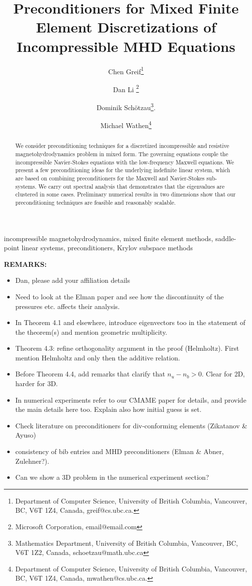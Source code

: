 \documentclass{siamltex}
\title{Preconditioners for Mixed Finite Element Discretizations of Incompressible MHD Equations}
\author{
Chen Greif\thanks{Department of Computer Science,
University of British Columbia, Vancouver, BC, V6T 1Z4, Canada,
 greif@cs.ubc.ca.} \and Dan Li \thanks{Microsoft Corporation, email@email.com} \and
 Dominik
Sch\"{o}tzau\thanks{Mathematics Department, University of British
Columbia, Vancouver, BC, V6T 1Z2, Canada,
schoetzau@math.ubc.ca}.
\and Michael Wathen\thanks{Department of Computer Science,
University of British Columbia, Vancouver, BC, V6T 1Z4, Canada,
 mwathen@cs.ubc.ca.}
}
\begin{document}
\maketitle


\begin{abstract}
We consider preconditioning techniques for a discretized incompressible and resistive magnetohydrodynamics problem in mixed form. The governing equations couple the incompressible Navier-Stokes equations with the low-frequency Maxwell equations. We present a few preconditioning ideas for the underlying indefinite linear system, which are based on combining preconditioners for the Maxwell and Navier-Stokes sub-systems. We carry out spectral analysis that demonstrates that the eigenvalues are clustered in some cases. Preliminary numerical results in two dimensions show that our preconditioning techniques are feasible and reasonably scalable.
\end{abstract}

\begin{keywords}
incompressible magnetohydrodynamics, mixed finite element methods, saddle-point linear systems, preconditioners, Krylov subspace methods
\end{keywords}

{\bf REMARKS:}
\begin{itemize}
\item Dan, please add your affiliation details
\item Need to look at the Elman paper and see how the discontinuity of the pressures etc. affects their analysis.
\item In Theorem 4.1 and elsewhere, introduce eigenvectors too in the statement of the theorem(s) and mention geometric multiplicity.
\item Theorem 4.3: refine orthogonality argument in the proof (Helmholtz). First mention Helmholtz and only then the additive relation.
\item Before Theorem 4.4, add remarks that clarify that $n_u-n_b>0$. Clear for 2D, harder for 3D.
\item In numerical experiments refer to our CMAME paper for details, and provide the main details here too. Explain also how initial guess is set.
\item Check literature on preconditioners for div-conforming elements (Zikatanov \& Ayuso)
\item consistency of bib entries
and MHD preconditioners (Elman \& Abner, Zulehner?).
\item Can we show a 3D problem in the numerical experiment section?

\end{itemize}
\end{document}

